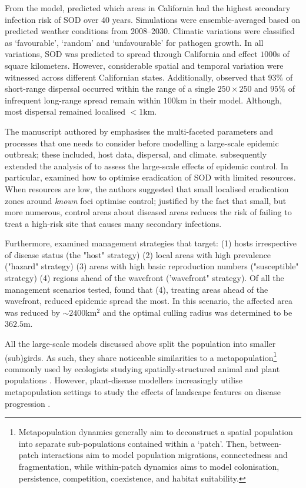 From the model, \cite{meentemeyer2011epidemiological} predicted which areas in California
had the highest secondary infection risk of SOD over $40$ years.
Simulations were ensemble-averaged based on predicted weather conditions from 2008–2030.
Climatic variations were classified as `favourable', `random' and `unfavourable' for
pathogen growth.
In all variations, SOD was predicted to spread through California and effect $1000$s
of square kilometers. However, considerable spatial and temporal variation were witnessed
across different Californian states. Additionally, \cite{meentemeyer2011epidemiological} 
observed that $93\%$ of short-range dispersal occurred within the range of a single $\mathrm{250 \times 250}$ and 
$95\%$ of infrequent long-range spread remain within $100\mathrm{km}$ in their model.
Although, most dispersal remained localised $<1\mathrm{km}$.

The manuscript authored by \cite{meentemeyer2011epidemiological} emphasises the multi-faceted 
parameters and processes that one needs to consider before modelling a large-scale epidemic
outbreak; these included, host data, dispersal, and climate.
\cite{large-scale-control} subsequently extended the analysis of \cite{meentemeyer2011epidemiological}
to assess the large-scale effects of epidemic control. 
In particular, \cite{large-scale-control} examined how to optimise eradication of SOD with 
limited resources. 
When resources are low, the authors suggested that small localised 
eradication zones around \textit{known} foci optimise control; justified by the fact that
small, but more numerous, control areas about diseased areas reduces the risk of failing 
to treat a high-risk site that causes many secondary infections. 

Furthermore, \cite{large-scale-control} examined management strategies that target:
(1) hosts irrespective of disease 
status (the "host" strategy)
(2) local areas with high prevalence ("hazard" strategy)
(3) areas with high basic reproduction numbers ("susceptible" strategy)
(4) regions ahead of the wavefront ('wavefront" strategy).
Of all the management scenarios tested, \cite{large-scale-control} found
that (4), treating areas ahead of the wavefront, reduced epidemic spread the most.
In this scenario, the affected area was reduced by $\sim 2400\mathrm{km^2}$ and 
the optimal culling radius was determined to be $362.5\mathrm{m}$.

All the large-scale models discussed above split the population into smaller (sub)girds.
As such, they share noticeable similarities to a metapopulation\footnote{
Metapopulation dynamics generally aim to deconstruct a spatial population into separate sub-populations
contained within a `patch'. Then, between-patch interactions aim to model population migrations, 
connectedness and fragmentation, while within-patch dynamics aims to model colonisation, persistence,
competition, coexistence, and habitat suitability.} commonly used by ecologists studying spatially-structured
animal and plant populations \cite{hanski1998metapopulation}. However, plant-disease modellers increasingly
utilise metapopulation settings to study the effects of landscape features on disease progression  \cite{beninca2020trade, soubeyrand2009spatiotemporal, doi:10.1046/j.1461-0248.2002.00378.x}.

